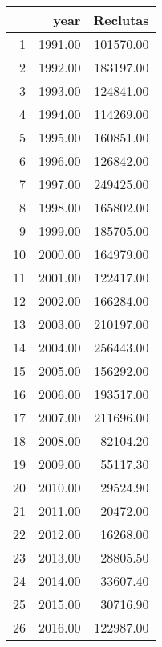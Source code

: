 \begin{table}[ht]
\centering
\begin{tabular}{rrr}
  \hline
 & year & Reclutas \\ 
  \hline
1 & 1991.00 & 101570.00 \\ 
  2 & 1992.00 & 183197.00 \\ 
  3 & 1993.00 & 124841.00 \\ 
  4 & 1994.00 & 114269.00 \\ 
  5 & 1995.00 & 160851.00 \\ 
  6 & 1996.00 & 126842.00 \\ 
  7 & 1997.00 & 249425.00 \\ 
  8 & 1998.00 & 165802.00 \\ 
  9 & 1999.00 & 185705.00 \\ 
  10 & 2000.00 & 164979.00 \\ 
  11 & 2001.00 & 122417.00 \\ 
  12 & 2002.00 & 166284.00 \\ 
  13 & 2003.00 & 210197.00 \\ 
  14 & 2004.00 & 256443.00 \\ 
  15 & 2005.00 & 156292.00 \\ 
  16 & 2006.00 & 193517.00 \\ 
  17 & 2007.00 & 211696.00 \\ 
  18 & 2008.00 & 82104.20 \\ 
  19 & 2009.00 & 55117.30 \\ 
  20 & 2010.00 & 29524.90 \\ 
  21 & 2011.00 & 20472.00 \\ 
  22 & 2012.00 & 16268.00 \\ 
  23 & 2013.00 & 28805.50 \\ 
  24 & 2014.00 & 33607.40 \\ 
  25 & 2015.00 & 30716.90 \\ 
  26 & 2016.00 & 122987.00 \\ 
   \hline
\end{tabular}
\end{table}
